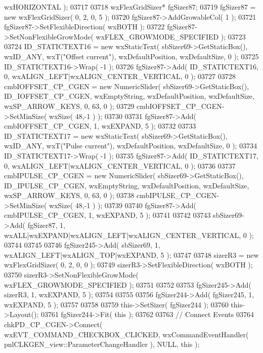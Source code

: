 \begin{DoxyCode}
      wxHORIZONTAL );
03717     
03718     wxFlexGridSizer* fgSizer87;
03719     fgSizer87 = \textcolor{keyword}{new} wxFlexGridSizer( 0, 2, 0, 5 );
03720     fgSizer87->AddGrowableCol( 1 );
03721     fgSizer87->SetFlexibleDirection( wxBOTH );
03722     fgSizer87->SetNonFlexibleGrowMode( wxFLEX\_GROWMODE\_SPECIFIED );
03723     
03724     ID_STATICTEXT16 = \textcolor{keyword}{new} wxStaticText( sbSizer69->GetStaticBox(), wxID\_ANY, wxT(\textcolor{stringliteral}{"Offset current"}), 
      wxDefaultPosition, wxDefaultSize, 0 );
03725     ID_STATICTEXT16->Wrap( -1 );
03726     fgSizer87->Add( ID_STATICTEXT16, 0, wxALIGN\_LEFT|wxALIGN\_CENTER\_VERTICAL, 0 );
03727     
03728     cmbIOFFSET_CP_CGEN = \textcolor{keyword}{new} NumericSlider( sbSizer69->GetStaticBox(), 
      ID_IOFFSET_CP_CGEN, wxEmptyString, wxDefaultPosition, wxDefaultSize, wxSP\_ARROW\_KEYS, 0, 63, 0 );
03729     cmbIOFFSET_CP_CGEN->SetMinSize( wxSize( 48,-1 ) );
03730     
03731     fgSizer87->Add( cmbIOFFSET_CP_CGEN, 1, wxEXPAND, 5 );
03732     
03733     ID_STATICTEXT17 = \textcolor{keyword}{new} wxStaticText( sbSizer69->GetStaticBox(), wxID\_ANY, wxT(\textcolor{stringliteral}{"Pulse current"}), 
      wxDefaultPosition, wxDefaultSize, 0 );
03734     ID_STATICTEXT17->Wrap( -1 );
03735     fgSizer87->Add( ID_STATICTEXT17, 0, wxALIGN\_LEFT|wxALIGN\_CENTER\_VERTICAL, 0 );
03736     
03737     cmbIPULSE_CP_CGEN = \textcolor{keyword}{new} NumericSlider( sbSizer69->GetStaticBox(), 
      ID_IPULSE_CP_CGEN, wxEmptyString, wxDefaultPosition, wxDefaultSize, wxSP\_ARROW\_KEYS, 0, 63, 0 );
03738     cmbIPULSE_CP_CGEN->SetMinSize( wxSize( 48,-1 ) );
03739     
03740     fgSizer87->Add( cmbIPULSE_CP_CGEN, 1, wxEXPAND, 5 );
03741     
03742     
03743     sbSizer69->Add( fgSizer87, 1, wxALL|wxEXPAND|wxALIGN\_LEFT|wxALIGN\_CENTER\_VERTICAL, 0 );
03744     
03745     
03746     fgSizer245->Add( sbSizer69, 1, wxALIGN\_LEFT|wxALIGN\_TOP|wxEXPAND, 5 );
03747     
03748     sizerR3 = \textcolor{keyword}{new} wxFlexGridSizer( 0, 2, 0, 0 );
03749     sizerR3->SetFlexibleDirection( wxBOTH );
03750     sizerR3->SetNonFlexibleGrowMode( wxFLEX\_GROWMODE\_SPECIFIED );
03751     
03752     
03753     fgSizer245->Add( sizerR3, 1, wxEXPAND, 5 );
03754     
03755     
03756     fgSizer244->Add( fgSizer245, 1, wxEXPAND, 5 );
03757     
03758     
03759     this->SetSizer( fgSizer244 );
03760     this->Layout();
03761     fgSizer244->Fit( \textcolor{keyword}{this} );
03762     
03763     \textcolor{comment}{// Connect Events}
03764     chkPD_CP_CGEN->Connect( wxEVT\_COMMAND\_CHECKBOX\_CLICKED, wxCommandEventHandler( 
      pnlCLKGEN_view::ParameterChangeHandler ), NULL, \textcolor{keyword}{this} );

\end{DoxyCode}
